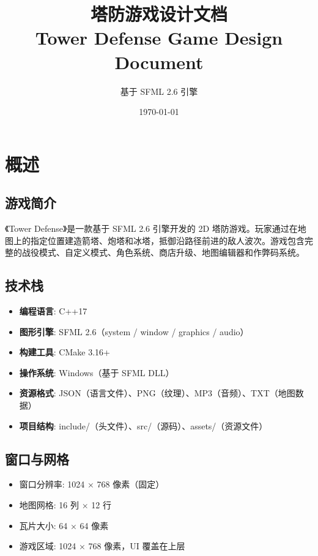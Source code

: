 \documentclass[12pt,a4paper]{ctexart}
\title{\textbf{塔防游戏设计文档 \\ \large Tower Defense Game Design Document}}
\author{基于 SFML 2.6 引擎}
\date{\today}
\begin{document}
\clearpage
\newpage
\pagestyle{empty}
\tableofcontents 
\thispagestyle{empty}
\clearpage
\newpage
{}
\pagestyle{fancy}
\section{概述}

\subsection{游戏简介}

《Tower Defense》是一款基于 SFML 2.6 引擎开发的 2D 塔防游戏。玩家通过在地图上的指定位置建造箭塔、炮塔和冰塔，抵御沿路径前进的敌人波次。游戏包含完整的战役模式、自定义模式、角色系统、商店升级、地图编辑器和作弊码系统。

\subsection{技术栈}

\begin{itemize}
    \item \textbf{编程语言}: C++17
    \item \textbf{图形引擎}: SFML 2.6（system / window / graphics / audio）
    \item \textbf{构建工具}: CMake 3.16+
    \item \textbf{操作系统}: Windows（基于 SFML DLL）
    \item \textbf{资源格式}: JSON（语言文件）、PNG（纹理）、MP3（音频）、TXT（地图数据）
    \item \textbf{项目结构}: include/（头文件）、src/（源码）、assets/（资源文件）
\end{itemize}

\subsection{窗口与网格}

\begin{itemize}
    \item 窗口分辨率: 1024 × 768 像素（固定）
    \item 地图网格: 16 列 × 12 行
    \item 瓦片大小: 64 × 64 像素
    \item 游戏区域: 1024 × 768 像素，UI 覆盖在上层
\end{itemize}
\end{document}
